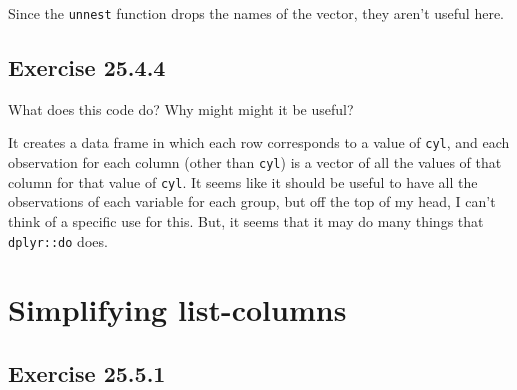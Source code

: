 \documentclass[]{book}
\newenvironment{Shaded}{\begin{snugshade}}{\end{snugshade}}
\newcommand{\CommentTok}[1]{\textcolor[rgb]{0.56,0.35,0.01}{\textit{#1}}}
\newcommand{\KeywordTok}[1]{\textcolor[rgb]{0.13,0.29,0.53}{\textbf{#1}}}
\newcommand{\NormalTok}[1]{#1}
\newcommand{\OperatorTok}[1]{\textcolor[rgb]{0.81,0.36,0.00}{\textbf{#1}}}
\newcommand{\StringTok}[1]{\textcolor[rgb]{0.31,0.60,0.02}{#1}}
\theoremstyle{plain}
\theoremstyle{remark}
\theoremstyle{definition}
\theoremstyle{definition}
\theoremstyle{definition}
\theoremstyle{remark}
\begin{document}
Since the \texttt{unnest} function drops the names of the vector, they
aren't useful here.

\hypertarget{exercise-25.4.4}{%
\subsection*{\texorpdfstring{Exercise
{25.4.4}}{Exercise 25.4.4}}\label{exercise-25.4.4}}

What does this code do? Why might might it be useful?

\begin{Shaded}
\end{Shaded}

It creates a data frame in which each row corresponds to a value of
\texttt{cyl}, and each observation for each column (other than
\texttt{cyl}) is a vector of all the values of that column for that
value of \texttt{cyl}. It seems like it should be useful to have all the
observations of each variable for each group, but off the top of my
head, I can't think of a specific use for this. But, it seems that it
may do many things that \texttt{dplyr::do} does.

\hypertarget{simplifying-list-columns}{%
\section{Simplifying list-columns}\label{simplifying-list-columns}}

\hypertarget{exercise-25.5.1}{%
\subsection*{\texorpdfstring{Exercise
{25.5.1}}{Exercise 25.5.1}}\label{exercise-25.5.1}}
\end{document}
